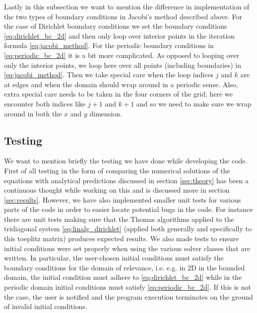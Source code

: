 \documentclass[12pt]{article}
\numberwithin{figure}{section}
\numberwithin{table}{section}
\begin{document}
\noindent Lastly in this subsection we want to mention the difference in implementation of the two types of boundary conditions in Jacobi's method described above. For the case of Dirichlet boundary conditions we set the boundary conditions \eqref{eq:dirichlet_bc_2d} and then only loop over interior points in the iteration formula \eqref{eq:jacobi_method}. For the periodic boundary conditions in \eqref{eq:periodic_bc_2d} it is a bit more complicated. As opposed to looping over only the interior points, we loop here over all points (including boundaries) in \eqref{eq:jacobi_method}. Then we take special care when the loop indices $j$ and $k$ are at edges and when the domain should wrap around in a periodic sense. Also, extra special care needs to be taken in the four corners of the grid; here we encounter both indices like $j+1$ and $k+1$ and so we need to make sure we wrap around in both the $x$ and $y$ dimension.

\subsection{Testing} \label{sec:testing}
We want to mention briefly the testing we have done while developing the code. First of all testing in the form of comparing the numerical solutions of the equations with analytical predictions discussed in section \ref{sec:theory} has been a continuous thought while working on this and is discussed more in section \ref{sec:results}. However, we have also implemented smaller unit tests for various parts of the code in order to easier locate potential bugs in the code. For instance there are unit tests making sure that the Thomas algorithms applied to the tridiagonal system \eqref{eq:linalg_dirichlet} (applied both generally and specifically to this toeplitz matrix) produces expected results. We also made tests to ensure initial conditions were set properly when using the various solver classes that are written. In particular, the user-chosen initial conditions must satisfy the boundary conditions for the domain of relevance, i.e. e.g. in 2D in the bounded domain, the initial condition must adhere to \eqref{eq:dirichlet_bc_2d} while in the periodic domain initial conditions must satisfy \eqref{eq:periodic_bc_2d}. If this is not the case, the user is notified and the program execution terminates on the ground of invalid initial conditions.
\end{document}
